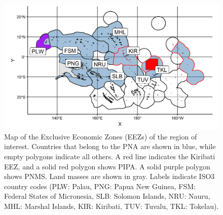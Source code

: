 \documentclass[12pt]{article}
\begin{document}
\begin{figure}
\centering
\includegraphics{img/PNA_map.png}
\caption{\label{fig:PNA_map}Map of the Exclusive Economic Zones (EEZs) of the region of interest. Countries that belong to the PNA are shown in blue, while empty polygons indicate all others. A red line indicates the Kiribati EEZ, and a solid red polygon shows PIPA. A solid purple polygon shows PNMS. Land masses are shown in gray. Labels indicate ISO3 country codes (PLW: Palau, PNG: Papua New Guinea, FSM: Federal States of Micronesia, SLB: Solomon Islands, NRU: Nauru, MHL: Marshal Islands, KIR: Kiribati, TUV: Tuvalu, TKL: Tokelau).}
\end{figure}
\end{document}
